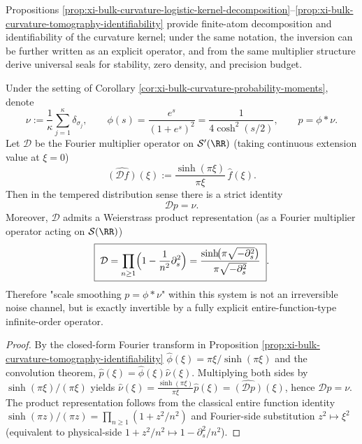 %

Propositions \ref{prop:xi-bulk-curvature-logistic-kernel-decomposition}--\ref{prop:xi-bulk-curvature-tomography-identifiability} provide finite-atom decomposition and identifiability of the curvature kernel;
under the same notation, the inversion can be further written as an explicit operator, and from the same multiplier structure derive universal seals for stability, zero density, and precision budget.

\begin{proposition}\label{prop:xi-bulk-curvature-exact-deconvolution-operator}
Under the setting of Corollary \ref{cor:xi-bulk-curvature-probability-moments}, denote
\[
\nu:=\frac{1}{\kappa}\sum_{j=1}^{\kappa}\delta_{\sigma_j},
\qquad
\phi(s)=\frac{e^{s}}{(1+e^{s})^{2}}=\frac{1}{4\cosh^{2}(s/2)},
\qquad
p=\phi*\nu.
\]
Let \(\mathcal D\) be the Fourier multiplier operator on \(\mathcal S'(\RR)\) (taking continuous extension value at \(\xi=0\))
\[
\widehat{(\mathcal D f)}(\xi):=\frac{\sinh(\pi\xi)}{\pi\xi}\,\widehat f(\xi).
\]
Then in the tempered distribution sense there is a strict identity
\[
\boxed{\;\mathcal D p=\nu.\;}
\]
Moreover, \(\mathcal D\) admits a Weierstrass product representation (as a Fourier multiplier operator acting on \(\mathcal S(\RR)\))
\[
\boxed{\;
\mathcal D=\prod_{n\ge1}\Bigl(1-\frac{1}{n^{2}}\partial_{s}^{2}\Bigr)
=\frac{\sinh\!\bigl(\pi\sqrt{-\partial_{s}^{2}}\bigr)}{\pi\sqrt{-\partial_{s}^{2}}}\; }.
\]
Therefore "scale smoothing \(p=\phi*\nu\)" within this system is not an irreversible noise channel, but is exactly invertible by a fully explicit entire-function-type infinite-order operator.
\end{proposition}
\begin{proof}
By the closed-form Fourier transform in Proposition \ref{prop:xi-bulk-curvature-tomography-identifiability}
\(
\widehat\phi(\xi)=\pi\xi/\sinh(\pi\xi)
\)
and the convolution theorem,
\(
\widehat p(\xi)=\widehat\phi(\xi)\widehat\nu(\xi)
\).
Multiplying both sides by \(\sinh(\pi\xi)/(\pi\xi)\) yields
\(
\widehat\nu(\xi)=\frac{\sinh(\pi\xi)}{\pi\xi}\widehat p(\xi)
=\widehat{(\mathcal D p)}(\xi)
\), hence \(\mathcal Dp=\nu\).
The product representation follows from the classical entire function identity
\(
\sinh(\pi z)/(\pi z)=\prod_{n\ge1}(1+z^{2}/n^{2})
\)
and Fourier-side substitution \(z^{2}\mapsto \xi^{2}\) (equivalent to physical-side \(1+z^{2}/n^{2}\mapsto 1-\partial_{s}^{2}/n^{2}\)).
\end{proof}

